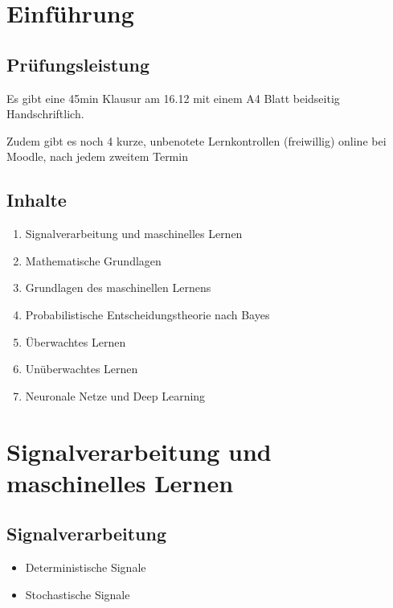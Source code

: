 \documentclass[a4paper]{article}
\title{\docTitle}
\author{Moritz}
\date{\today}
\begin{document}
\maketitle
\tableofcontents


\section{Einführung}

\subsection{Prüfungsleistung}

Es gibt eine 45min Klausur am 16.12 mit einem A4 Blatt beidseitig Handschriftlich.

Zudem gibt es noch 4 kurze, unbenotete Lernkontrollen (freiwillig) online bei Moodle, nach jedem zweitem Termin

\subsection{Inhalte}

\begin{enumerate}
    \item Signalverarbeitung und maschinelles Lernen
    \item Mathematische Grundlagen
    \item Grundlagen des maschinellen Lernens
    \item Probabilistische Entscheidungstheorie nach Bayes
    \item Überwachtes Lernen
    \item Unüberwachtes Lernen
    \item Neuronale Netze und Deep Learning
\end{enumerate}

\section{Signalverarbeitung und maschinelles Lernen}

\subsection{Signalverarbeitung}

\begin{itemize}
    \item Deterministische Signale
    \item Stochastische Signale
\end{itemize}
\end{document}
